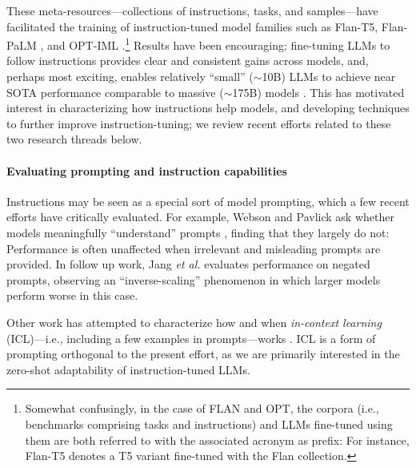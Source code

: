 These meta-resources---collections of instructions, tasks, and samples---have facilitated the training of instruction-tuned model families such as Flan-T5, Flan-PaLM \cite{chung2022scaling}, and OPT-IML \cite{iyer2022opt}.\footnote{Somewhat confusingly, in the case of FLAN and OPT, the corpora (i.e., benchmarks comprising tasks and instructions) and LLMs fine-tuned using them are both referred to with the associated acronym as prefix: For instance, Flan-T5 denotes a T5 \cite{raffel2020exploring} variant fine-tuned with the Flan collection.}
Results have been encouraging; fine-tuning LLMs to follow instructions provides clear and consistent gains across models, and, perhaps most exciting, enables relatively ``small'' ($\sim$10B) LLMs to achieve near SOTA performance comparable to massive ($\sim$175B) models \cite{alpaca}. 
This has motivated interest in characterizing how instructions help models, and developing techniques to further improve instruction-tuning; we review recent efforts related to these two research threads below. 

\paragraph{Evaluating prompting and instruction capabilities}
Instructions may be seen as a special sort of model prompting, which a few recent efforts have critically evaluated. 
For example, Webson and Pavlick ask whether models meaningfully ``understand'' prompts \cite{webson2021prompt}, finding that they largely do not: %
Performance is often unaffected when irrelevant and misleading prompts are provided. 
In follow up work, Jang \emph{et al.}
\cite{jang2023can} evaluates performance on negated prompts, observing an ``inverse-scaling'' phenomenon in which larger models perform worse in this case.

Other work has attempted to characterize how and when \emph{in-context learning} (ICL)---i.e., including a few examples in prompts---works \cite{min2022rethinking,wang2023large,dai2022can,akyurek2022learning,yu2022alert}. 
ICL is a form of prompting orthogonal to the present effort, as we are primarily interested in the zero-shot adaptability of instruction-tuned LLMs.

